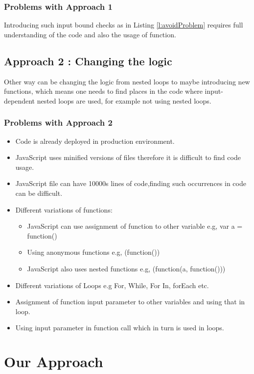 \documentclass[authoryear,preprint]{sigplanconf}
\begin{document}
\subsubsection{Problems with Approach 1}

Introducing such input bound checks as in Listing \ref{l:avoidProblem} requires full understanding of the code and also the usage of function.

\subsection{Approach 2 : Changing the logic} 
Other way can be changing the logic from nested loops to maybe introducing new functions, which means one needs to find places in the code where input-dependent nested loops are used, for example not using nested loops.
\subsubsection{Problems with Approach 2}
\begin{itemize}
\item Code is already deployed in production environment.
\item JavaScript uses minified versions of files therefore it is difficult to find code usage.
\item JavaScript file can have 10000s lines of code,finding such occurrences in code can be difficult.
\item Different variations of functions:
		\begin{itemize}
			\item JavaScript can use assignment of function to other variable 
				e.g, var a = function() {}
			\item Using anonymous functions
				e.g, (function())
			\item JavaScript also uses nested functions
				e.g, (function(a, function(){}))
		\end{itemize}
\item Different variations of Loops
	 e.g  For, While, For In, forEach etc.
\item Assignment of function input parameter to other variables and using that in loop.
\item Using input parameter in function call which in turn is used in loops.
			
\end{itemize}

\section{Our Approach}
\end{document}
